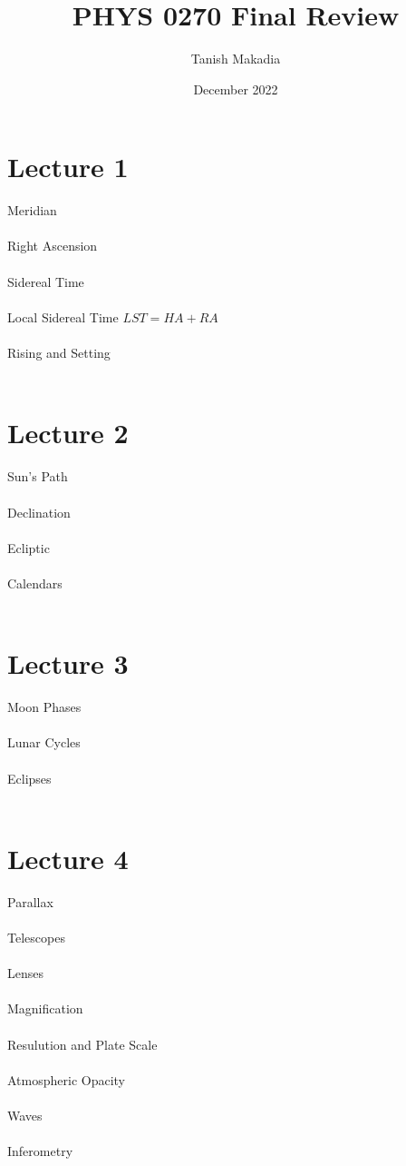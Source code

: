 \documentclass[11pt,reqno]{article}
\title{PHYS 0270 Final Review}
\author{Tanish Makadia}
\date{December 2022}
\theoremstyle{definition}
\begin{document}
\maketitle


\newpage

\section*{Lecture 1}
Meridian\\\\
Right Ascension\\\\
Sidereal Time\\\\
Local Sidereal Time $LST = HA + RA$\\\\
Rising and Setting\\\\

\section*{Lecture 2}
Sun's Path\\\\
Declination\\\\
Ecliptic\\\\
Calendars\\\\

\section*{Lecture 3}
Moon Phases\\\\
Lunar Cycles\\\\
Eclipses\\\\

\section*{Lecture 4}
Parallax\\\\
Telescopes\\\\
Lenses\\\\
Magnification\\\\
Resulution and Plate Scale\\\\
Atmospheric Opacity\\\\
Waves\\\\
Inferometry\\\\
\end{document}
